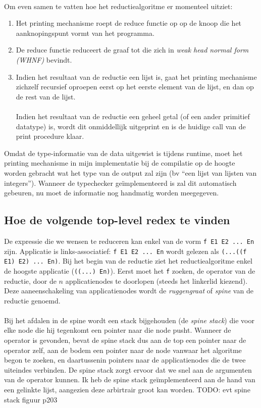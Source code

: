 \documentclass[a4paper,10pt]{article}
\begin{document}
\paragraph{}
Om even samen te vatten hoe het reductiealgoritme er momenteel uitziet:
\begin{enumerate}
\item
  Het printing mechanisme roept de reduce functie op op de knoop die het aanknopingspunt vormt van het programma.
\item
  De reduce functie reduceert de graaf tot die zich in \emph{weak head normal form (WHNF)} bevindt.
\item
  Indien het resultaat van de reductie een lijst is, gaat het printing mechanisme zichzelf recursief oproepen eerst op het eerste element van de lijst, en dan op de rest van de lijst.
  \paragraph{}
  Indien het resultaat van de reductie een geheel getal (of een ander primitief datatype) is, wordt dit onmiddellijk uitgeprint en is de huidige call van de print procedure klaar.
\end{enumerate}
Omdat de type-informatie van de data uitgewist is tijdens runtime, moet het printing mechanisme in mijn implementatie bij de compilatie op de hoogte worden gebracht wat het type van de output zal zijn (bv ``een lijst van lijsten van integers'').
Wanneer de typechecker ge{\"i}mplementeerd is zal dit automatisch gebeuren, nu moet de informatie nog handmatig worden meegegeven.

\subsection{Hoe de volgende top-level redex te vinden}
De expressie die we wensen te reduceren kan enkel van de vorm \texttt{f E1 E2 ... En} zijn.
Applicatie is links-associatief: \texttt{f E1 E2 ... En} wordt gelezen als \texttt{(...((f E1) E2) ... En)}.
Bij het begin van de reductie ziet het reductiealgoritme enkel de hoogste applicatie (\texttt{((...) En)}).
Eerst moet het \texttt{f} zoeken, de operator van de reductie, door de $n$ applicatienodes te doorlopen (steeds het linkerlid kiezend).
Deze aaneenschakeling van applicatienodes wordt de \emph{ruggengraat} of \emph{spine} van de reductie genoemd.
\paragraph{}
Bij het afdalen in de spine wordt een stack bijgehouden (de \emph{spine stack}) die voor elke node die hij tegenkomt een pointer naar die node pusht.
Wanneer de operator is gevonden, bevat de spine stack dus aan de top een pointer naar de operator zelf, aan de bodem een pointer naar de node vanwaar het algoritme begon te zoeken, en daartussenin pointers naar de applicatienodes die de twee uiteindes verbinden.
De spine stack zorgt ervoor dat we snel aan de argumenten van de operator kunnen.
Ik heb de spine stack ge{\"i}mplementeerd aan de hand van een gelinkte lijst, aangezien deze arbirtrair groot kan worden.
TODO: evt spine stack figuur p203
\end{document}
